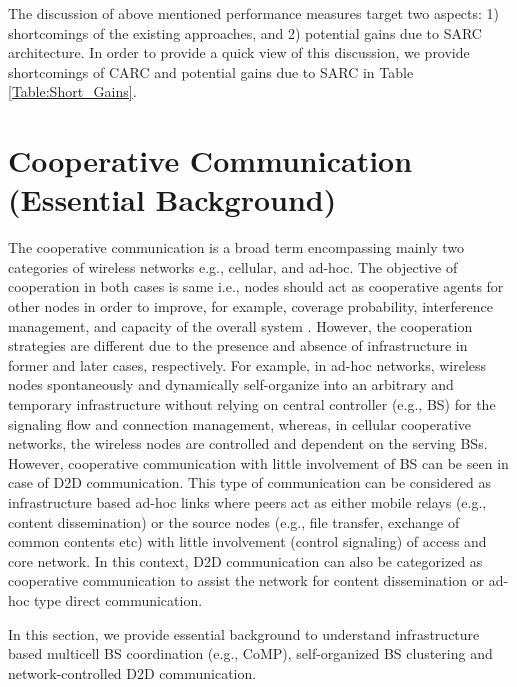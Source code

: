 \documentclass[article,10pt,twocolumn]{IEEEtran}
\begin{document}
The discussion of above mentioned performance measures target two aspects: 1) shortcomings of the existing approaches, and 2) potential gains due to SARC architecture. In order to provide a quick view of this discussion, we provide shortcomings of CARC and potential gains due to SARC in Table \ref{Table:Short_Gains}.
\section{Cooperative Communication (Essential Background)}\label{sec:cc}
The cooperative communication is a broad term encompassing mainly two categories of wireless networks e.g., cellular, and ad-hoc. The objective of cooperation in both cases is same i.e., nodes should act as cooperative agents for other nodes in order to improve, for example, coverage probability, interference management, and capacity of the overall system \citep{ahn2011wireless}. However, the cooperation strategies are different due to the presence and absence of infrastructure in former and later cases, respectively. For example, in ad-hoc networks, wireless nodes spontaneously and dynamically self-organize into an arbitrary and temporary infrastructure \citep{rubinstein2006survey} without relying on central controller (e.g., BS) for the signaling flow and connection management, whereas, in cellular cooperative networks, the wireless nodes are controlled and dependent on the serving BSs. However, cooperative communication with little involvement of BS can be seen in case of D2D communication. This type of communication can be considered as infrastructure based ad-hoc links where peers act as either mobile relays (e.g., content dissemination) or the source nodes (e.g., file transfer, exchange of common contents etc) with little involvement (control signaling) of access and core network. In this context, D2D communication can also be categorized as cooperative communication to assist the network for content dissemination or ad-hoc type direct communication.

In this section, we provide essential background to understand infrastructure based multicell BS coordination (e.g., CoMP), self-organized BS clustering and network-controlled D2D communication.
\end{document}
